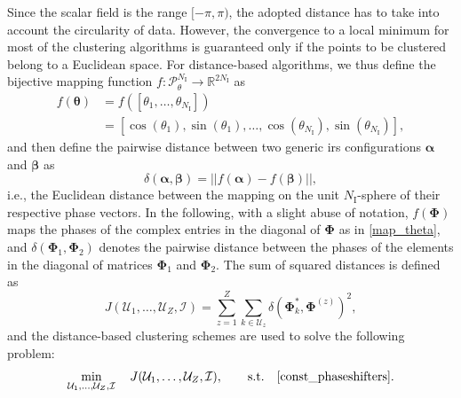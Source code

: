 Since the scalar field is the range $[-\pi,\pi)$, the adopted distance has to take into account the circularity of data.
However, the convergence to a local minimum for most of the clustering algorithms is guaranteed only if the points to be clustered belong to a Euclidean space. 
For distance-based algorithms, %
we thus define the bijective mapping function $f : \mathcal{P}_{\theta}^{N_{\mathrm I}} \to \mathbb{R}^{2N_{\mathrm I}}$ as
\begin{align}\label{map_theta}
    f(\bm{\theta}) &= f(\left[\theta_{1},\ldots,\theta_{N_{\mathrm I}}\right]) \nonumber \\ 
    &= \left[ \cos(\theta_{1}),\sin(\theta_{1}),\ldots,\cos(\theta_{N_{\mathrm I}}),\sin(\theta_{N_{\mathrm I}}) \right],
\end{align}
and then define the pairwise {distance} between two generic \gls{irs} configurations $\bm{\alpha}$ and $\bm{\beta}$ as
\begin{equation}\label{circdist}
    \delta(\bm{\alpha},\bm{\beta}) = \vert\vert f(\bm{\alpha}) - f(\bm{\beta}) \vert\vert,
\end{equation}
i.e., the Euclidean distance between the mapping on the unit $N_{\mathrm I}$-sphere of their respective phase vectors. In the following, with a slight abuse of notation, $f(\bm{\Phi})$ maps the phases of the complex entries in the diagonal of $\bm{\Phi}$ as in \eqref{map_theta}, and $\delta(\bm{\Phi}_1, \bm{\Phi}_2)$ denotes the pairwise distance between the phases of the elements in the diagonal of matrices $\bm{\Phi}_1$ and $\bm{\Phi}_2$.
The sum of squared distances is defined as
\begin{equation}\label{distancemin}
    J(\mathcal{U}_1,\ldots,\mathcal{U}_{Z},\mathcal{I})= \sum_{z=1}^Z\sum_{k \in \mathcal{U}_z}\delta\left(\bm{\Phi}_k^*, \bm{\Phi}^{(z)}\right)^2,
\end{equation}
and the distance-based clustering schemes are used to solve the following problem:
\begin{equation}\label{optproblemdist}
    \min_{\substack{\mathcal{U}_1,\ldots,\mathcal{U}_{Z}, \mathcal{I}}} \quad  J(\mathcal{U}_1,\ldots,\mathcal{U}_{Z},\mathcal{I}),
    \quad \quad \text{s.t.}\quad \eqref{const_phaseshifters}.
\end{equation}


